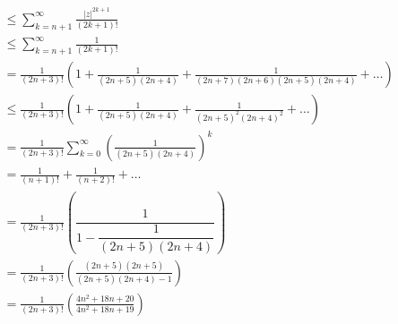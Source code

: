 \documentclass[12pt]{article}
\newenvironment{exercise}[2][Exercise]{\begin{trivlist}
\item[\hskip \labelsep {\bfseries #1} \hskip \labelsep {\bfseries #2.}]}{\end{trivlist}}
\begin{document}
\begin{exercise}{5.2.18}
\begin{align*}
										  &\le \sum_{k=n+1}^{\infty} \frac{|z|^{2k+1}}{(2k+1)!} \\
										  &\le \sum_{k=n+1}^{\infty} \frac{1}{(2k+1)!} \\
										  &= \frac{1}{(2n + 3)!}\left(1 + \frac{1}{(2n + 5)(2n + 4)} + \frac{1}{(2n + 7)(2n + 6)(2n + 5)(2n + 4)} + \ldots\right) \\
										  &\le \frac{1}{(2n+3)!}\left(1 + \frac{1}{(2n + 5)(2n + 4)} + \frac{1}{(2n + 5)^2(2n + 4)^2} + \ldots\right) \\
										  &= \frac{1}{(2n + 3)!}\sum_{k=0}^{\infty} \left(\frac{1}{(2n + 5)(2n + 4)}\right)^k \\
										  &= \frac{1}{(n+1)!} + \frac{1}{(n+2)!} + \ldots \\
										  &= \frac{1}{(2n + 3)!}\left(\dfrac{1}{1 - \dfrac{1}{(2n + 5)(2n + 4)}}\right) \\
										  &= \frac{1}{(2n + 3)!}\left(\frac{(2n + 5)(2n + 5)}{(2n + 5)(2n + 4) - 1}\right) \\
										  &= \frac{1}{(2n + 3)!}\left(\frac{4n^2 + 18n + 20}{4n^2 + 18n + 19}\right)
	\end{align*}
\end{exercise}	
\end{document}
